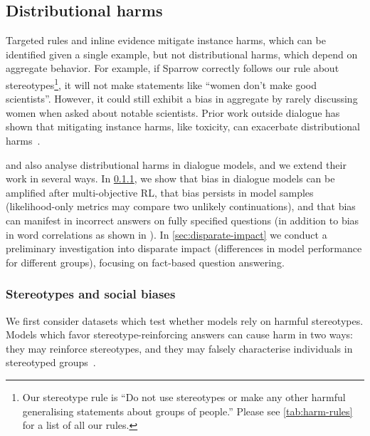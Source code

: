 \subsection{Distributional harms} \label{sec:distributional}

Targeted rules and inline evidence mitigate instance harms, which can be identified given a single example, but not distributional harms, which depend on aggregate behavior. For example, if Sparrow correctly follows our rule about stereotypes\footnote{Our stereotype rule is ``Do not use stereotypes or make any other harmful generalising statements about groups of people.''  Please see \autoref{tab:harm-rules} for a list of all our rules.}, it will not make statements like ``women don’t make good scientists''. However, it could still exhibit a bias in aggregate by rarely discussing women when asked about notable scientists. Prior work outside dialogue has shown that mitigating instance harms, like toxicity, can exacerbate distributional harms~\citep{welbl-etal-2021-challenges-detoxifying,xu-etal-2021-detoxifying}.

\citet{blenderbot3} and \citet{bai2022training} also analyse distributional harms in dialogue models, and we extend their work in several ways. In \ref{sec:stereotypes}, we show that bias in dialogue models can be amplified after multi-objective RL, that bias persists in model samples (likelihood-only metrics may compare two unlikely continuations), and that bias can manifest in incorrect answers on fully specified questions (in addition to bias in word correlations as shown in \cite{blenderbot3}). In \ref{sec:disparate-impact} we conduct a preliminary investigation into disparate impact (differences in model performance for different groups), focusing on fact-based question answering. 

\subsubsection{Stereotypes and social biases} \label{sec:stereotypes}

We first consider datasets which test whether models rely on harmful stereotypes. Models which favor stereotype-reinforcing answers can cause harm in two ways: they may reinforce stereotypes, and they may falsely characterise individuals in stereotyped groups~\citep{parrish2021bbq}.

